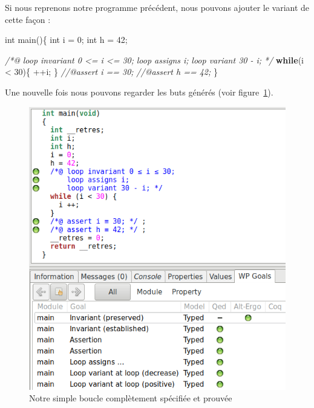 \documentclass[12pt,francais,]{scrbook}
\newenvironment{Shaded}{}{}
\newcommand{\KeywordTok}[1]{\textcolor[rgb]{0.00,0.44,0.13}{\textbf{{#1}}}}
\newcommand{\DataTypeTok}[1]{\textcolor[rgb]{0.56,0.13,0.00}{{#1}}}
\newcommand{\DecValTok}[1]{\textcolor[rgb]{0.25,0.63,0.44}{{#1}}}
\newcommand{\CommentTok}[1]{\textcolor[rgb]{0.38,0.63,0.69}{\textit{{#1}}}}
\newcommand{\NormalTok}[1]{{#1}}
\begin{document}
Si nous reprenons notre programme précédent, nous pouvons ajouter le
variant de cette façon :

\begin{footnotesize}\begin{Shaded}
\begin{Highlighting}[]
\DataTypeTok{int} \NormalTok{main()\{}
  \DataTypeTok{int} \NormalTok{i = }\DecValTok{0}\NormalTok{;}
  \DataTypeTok{int} \NormalTok{h = }\DecValTok{42}\NormalTok{;}
  
  \CommentTok{/*@}
\CommentTok{    loop invariant 0 <= i <= 30;}
\CommentTok{    loop assigns i;}
\CommentTok{    loop variant 30 - i;}
\CommentTok{  */}
  \KeywordTok{while}\NormalTok{(i < }\DecValTok{30}\NormalTok{)\{}
    \NormalTok{++i;}
  \NormalTok{\}}
  \CommentTok{//@assert i == 30;}
  \CommentTok{//@assert h == 42;}
\NormalTok{\}}
\end{Highlighting}
\end{Shaded}\end{footnotesize}

Une nouvelle fois nous pouvons regarder les buts générés (voir
figure~\ref{fig:3-3-loop-ok}).

\begin{figure}[htbp]
\centering
\includegraphics[scale=0.5]{3-3-boucle_complete.png}
\caption{Notre simple boucle complètement spécifiée et prouvée}
\label{fig:3-3-loop-ok}
\end{figure}
\end{document}
